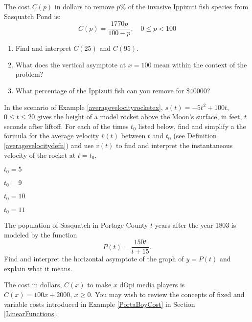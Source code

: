 \begin{exenum}

\item The cost $C(p)$ in dollars to remove $p$\% of the invasive  Ippizuti fish species from Sasquatch Pond is: \[C(p) = \frac{1770p}{100 - p}, \quad 0 \leq p < 100 \]

\begin{enumerate}

\item Find and interpret $C(25)$ and $C(95)$.
\item What does the vertical asymptote at $x = 100$ mean within the context of the problem?
\item What percentage of the Ippizuti fish can you remove for  \$40000?

\end{enumerate}

\item  In the scenario of  Example \ref{averagevelocityrocketex}, $s(t) = -5t^2+100t$, $0 \leq t \leq 20$ gives the height of a model rocket above the Moon's surface, in feet,  $t$ seconds after liftoff.  For each of the times $t_{0}$ listed below, find and simplify a the formula for the average velocity $\overline{v}(t)$ between $t$ and $t_{0}$ (see Definition \ref{averagevelocitydefn}) and use $\overline{v}(t)$ to find and interpret the instantaneous velocity of the rocket at $t = t_{0}$.

\begin{shortenumerate}

\item  $t_{0} = 5$

\item $t_{0} = 9$

\item $t_{0} = 10$

\item  $t_{0} = 11$

\end{shortenumerate}


\item \label{squatchpop} The population of Sasquatch in Portage County $t$ years after the year 1803 is modeled by the function \[P(t) = \frac{150t}{t + 15}.\] Find and interpret the horizontal asymptote of the graph of $y = P(t)$ and explain what it means.

\item  The cost in dollars, $C(x)$ to make $x$ dOpi media players is $C(x) = 100x+2000$, $x \geq 0$.  You may wish to review the concepts of fixed and variable costs introduced in  Example \ref{PortaBoyCost} in Section \ref{LinearFunctions}.


\end{exenum}
